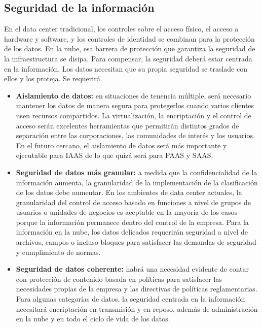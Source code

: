 \documentclass[12pt,a4paper]{article}
\begin{document}
\subsection{Seguridad de la información}
En el data center tradicional, los controles sobre el acceso
físico, el acceso a hardware y software, y los controles de
identidad se combinan para la protección de los datos. En la
nube, esa barrera de protección que garantiza la seguridad
de la infraestructura se disipa. Para compensar, la seguridad
deberá estar centrada en la información. Los datos necesitan
que su propia seguridad se traslade con ellos y los proteja.
Se requerirá.

\begin{itemize}

\item \textbf{Aislamiento de datos:} en situaciones de tenencia
múltiple, será necesario mantener los datos de manera
segura para protegerlos cuando varios clientes usen
recursos compartidos. La virtualización, la encriptación
y el control de acceso serán excelentes herramientas
que permitirán distintos grados de separación entre
las corporaciones, las comunidades de interés y los
usuarios. En el futuro cercano, el aislamiento de datos
será más importante y ejecutable para IAAS de lo que
quizá será para PAAS y SAAS.

\item \textbf{Seguridad de datos más granular:} a medida que
la confidencialidad de la información aumenta, la
granularidad de la implementación de la clasificación
de los datos debe aumentar. En los ambientes de data
center actuales, la granularidad del control de acceso
basado en funciones a nivel de grupos de usuarios o
unidades de negocios es aceptable en la mayoría de
los casos porque la información permanece dentro del
control de la empresa. Para la información en la nube,
los datos delicados requerirán seguridad a nivel de
archivos, campos o incluso bloques para satisfacer las
demandas de seguridad y cumplimiento de normas.

\item \textbf{Seguridad de datos coherente:} habrá una necesidad
evidente de contar con protección de contenido basada
en políticas para satisfacer las necesidades propias de la
empresa y las directivas de políticas reglamentarias. Para
algunas categorías de datos, la seguridad centrada en la
información necesitará encriptación en transmisión y en
reposo, además de administración en la nube y en todo
el ciclo de vida de los datos.


\end{itemize}
\end{document}
